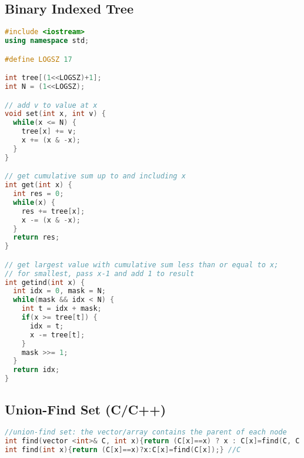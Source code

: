 \subsection{Binary Indexed Tree}
\begin{lstlisting}[language=C++]
#include <iostream>
using namespace std;

#define LOGSZ 17

int tree[(1<<LOGSZ)+1];
int N = (1<<LOGSZ);

// add v to value at x
void set(int x, int v) {
  while(x <= N) {
    tree[x] += v;
    x += (x & -x);
  }
}

// get cumulative sum up to and including x
int get(int x) {
  int res = 0;
  while(x) {
    res += tree[x];
    x -= (x & -x);
  }
  return res;
}

// get largest value with cumulative sum less than or equal to x;
// for smallest, pass x-1 and add 1 to result
int getind(int x) {
  int idx = 0, mask = N;
  while(mask && idx < N) {
    int t = idx + mask;
    if(x >= tree[t]) {
      idx = t;
      x -= tree[t];
    }
    mask >>= 1;
  }
  return idx;
}

\end{lstlisting}
\subsection{Union-Find Set (C/C++)}
\begin{lstlisting}[language=C++]
//union-find set: the vector/array contains the parent of each node
int find(vector <int>& C, int x){return (C[x]==x) ? x : C[x]=find(C, C[x]);} //C++
int find(int x){return (C[x]==x)?x:C[x]=find(C[x]);} //C

\end{lstlisting}
